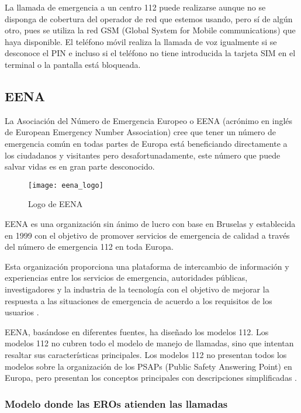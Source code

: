 La llamada de emergencia a un centro 112 puede realizarse aunque no se disponga de cobertura del operador de red que estemos usando, pero sí de algún otro, pues se utiliza la red GSM (Global System for Mobile communications) que haya disponible. El teléfono móvil realiza la llamada de voz igualmente si se desconoce el PIN e incluso si el teléfono no tiene introducida la tarjeta SIM en el terminal o la pantalla está bloqueada.

\subsection{EENA}

La Asociación del Número de Emergencia Europeo o EENA (acrónimo en inglés de European Emergency Number Association) cree que tener un número de emergencia común en todas partes de Europa está beneficiando directamente a los ciudadanos y visitantes pero desafortunadamente, este número que puede salvar vidas es en gran parte desconocido.

\begin{figure}[htp!]
  \centering
  \texttt{[image: eena\_logo]}
  \caption{Logo de EENA}
  \label{fig:eena_logo}
\end{figure}

EENA es una organización sin ánimo de lucro con base en Bruselas y establecida en 1999 con el objetivo de promover servicios de emergencia de calidad a través del número de emergencia 112 en toda Europa.

Esta organización proporciona una plataforma de intercambio de información y experiencias entre los servicios de emergencia, autoridades públicas, investigadores y la industria de la tecnología con el objetivo de mejorar la respuesta a las situaciones de emergencia de acuerdo a los requisitos de los usuarios \cite{ng2}.

EENA, basándose en diferentes fuentes, ha diseñado los modelos 112. Los modelos 112 no cubren todo el modelo de manejo de llamadas, sino que intentan resaltar sus características principales. Los modelos 112 no presentan todos los modelos sobre la organización de los PSAPs (Public Safety Answering Point) en Europa, pero presentan los conceptos principales con descripciones simplificadas \cite{eena3}.

\subsubsection{Modelo donde las EROs atienden las llamadas}

